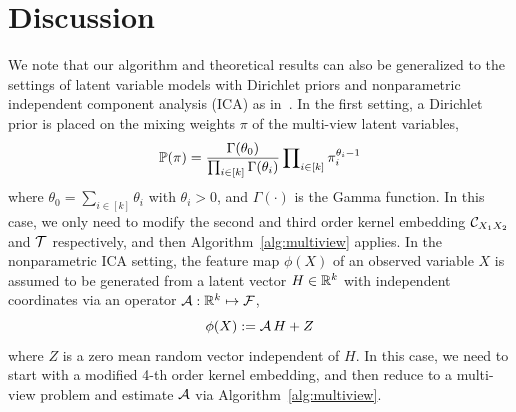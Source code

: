 \documentclass{article}
\begin{document}
\vspace{-3mm}
\section{Discussion}
\vspace{-2mm}

We note that our algorithm and theoretical results can also be generalized to the settings of latent variable models with Dirichlet priors and nonparametric independent component analysis (ICA) as in~\citet{AnandkumarEtal:tensor12}. In the first setting, a Dirichlet prior is placed on the mixing weights $\pi$ of the multi-view latent variables,
$$
	\mathbb{P}(\pi) = \frac{\Gamma(\theta_0)}{\prod\nolimits_{i \in [k]} \Gamma(\theta_i)} \prod\nolimits_{i \in [k]} \pi_i^{\theta_i - 1}
$$
where $\theta_0 = \sum_{i \in [k]} \theta_i$ with $\theta_i > 0$, and $\Gamma(\cdot)$ is the Gamma function. In this case, we only need to modify the second and third order kernel embedding $\mathcal{C}_{X_1X_2}$ and ${\mathcal{T}}$ respectively, and then Algorithm~\ref{alg:multiview} applies. In the nonparametric ICA setting, the feature map $\phi(X)$ of an observed variable $X$ is assumed to be generated from a latent vector $H \in \mathbb{R}^k$ with independent coordinates via an operator $\mathcal{A}:\mathbb{R}^k \mapsto \mathcal{F}$,
$$
	\phi(X) := \mathcal{A}\, H + Z
$$
where $Z$ is a zero mean random vector independent of $H$. In this case,
we need to start with a modified 4-th order kernel embedding, and then reduce to a multi-view problem and estimate $\mathcal{A}$ via Algorithm~\ref{alg:multiview}.
\end{document}
